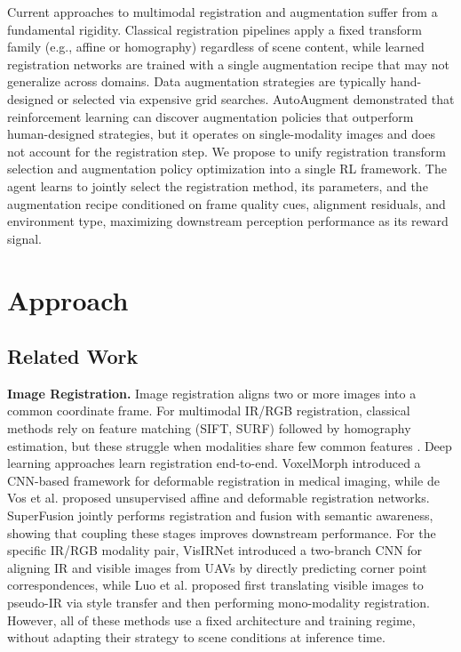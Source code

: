 \documentclass[12pt]{article}
\begin{document}
Current approaches to multimodal registration and augmentation suffer from a fundamental rigidity. Classical registration pipelines apply a fixed transform family (e.g., affine or homography) regardless of scene content, while learned registration networks \citep{Balakrishnan2019VoxelMorph, DeVos2019RLRegistration} are trained with a single augmentation recipe that may not generalize across domains. Data augmentation strategies are typically hand-designed or selected via expensive grid searches. AutoAugment \citep{Cubuk2019AutoAugment} demonstrated that reinforcement learning can discover augmentation policies that outperform human-designed strategies, but it operates on single-modality images and does not account for the registration step. We propose to unify registration transform selection and augmentation policy optimization into a single RL framework. The agent learns to jointly select the registration method, its parameters, and the augmentation recipe conditioned on frame quality cues, alignment residuals, and environment type, maximizing downstream perception performance as its reward signal.

\section{Approach}

\subsection{Related Work}

\textbf{Image Registration.} Image registration aligns two or more images into a common coordinate frame. For multimodal IR/RGB registration, classical methods rely on feature matching (SIFT, SURF) followed by homography estimation, but these struggle when modalities share few common features \citep{Ma2022ImageFusion}. Deep learning approaches learn registration end-to-end. VoxelMorph \citep{Balakrishnan2019VoxelMorph} introduced a CNN-based framework for deformable registration in medical imaging, while de Vos et al. \citep{DeVos2019RLRegistration} proposed unsupervised affine and deformable registration networks. SuperFusion \citep{Tang2022SuperFusion} jointly performs registration and fusion with semantic awareness, showing that coupling these stages improves downstream performance. For the specific IR/RGB modality pair, VisIRNet \citep{Ozer2024VisIRNet} introduced a two-branch CNN for aligning IR and visible images from UAVs by directly predicting corner point correspondences, while Luo et al. \citep{Luo2023CrossModalityRegistration} proposed first translating visible images to pseudo-IR via style transfer and then performing mono-modality registration. However, all of these methods use a fixed architecture and training regime, without adapting their strategy to scene conditions at inference time.
\end{document}
